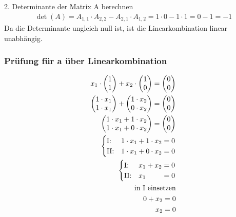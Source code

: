2. Determinante der Matrix A berechnen
    \begin{align*}
        \det(A) = A_{1,1} \cdot A_{2,2} - A_{2,1} \cdot A_{1,2} = 1 \cdot 0 - 1 \cdot 1 = 0 - 1 = -1
    \end{align*}
    Da die Determinante ungleich null ist, ist die Linearkombination linear unabhängig.

\subsubsection{Prüfung für a über Linearkombination}

\begin{align*}
    x_1 \cdot \begin{pmatrix}
        1 \\1
    \end{pmatrix} + x_2 \cdot \begin{pmatrix}
        1 \\0
    \end{pmatrix} = \begin{pmatrix}
        0 \\0
    \end{pmatrix} \\
        \begin{pmatrix}
        1 \cdot x_1 \\1 \cdot x_1
    \end{pmatrix} +\begin{pmatrix}
        1 \cdot x_2 \\0 \cdot x_2
    \end{pmatrix} = \begin{pmatrix}
        0 \\0
    \end{pmatrix} \\
            \begin{pmatrix}
        1 \cdot x_1 + 1 \cdot x_2 \\1 \cdot x_1 + 0 \cdot x_2
    \end{pmatrix} = \begin{pmatrix}
        0 \\0
    \end{pmatrix} \\
    \begin{cases}
       \text{I:\@} & 1 \cdot x_1 + 1  \cdot x_2 = 0 \\
       \text{II:\@} & 1 \cdot x_1 + 0 \cdot x_2 = 0
    \end{cases} \\
    \begin{cases}
       \text{I:\@} & x_1 + x_2 = 0 \\
       \text{II:\@} & x_1 \phantom{{} + x_2} = 0
    \end{cases}\\
    \text{in I einsetzen} \\
    0 + x_2 = 0 \\
    x_2 = 0
\end{align*}

